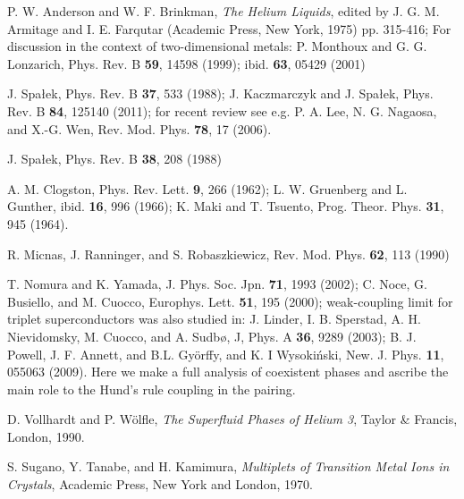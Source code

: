 \documentclass[aps,prb,showpacs,reprint]{revtex4-1}
\begin{document}
\begin{thebibliography}{99}
P. W. Anderson and W. F. Brinkman, \textit{The Helium Liquids}, edited by J. G.
M. Armitage and I. E. Farqutar (Academic Press, New York, 1975) pp. 315-416;
\newline
For discussion in the context of two-dimensional metals:\newline
P. Monthoux and G. G. Lonzarich, Phys. Rev. B {\bf 59}, 14598 (1999); ibid. {\bf 63}, 05429 (2001)


J. Spa\l ek, Phys. Rev. B {\bf 37}, 533 (1988); \newline
J. Kaczmarczyk and J. Spa\l ek, Phys. Rev. B {\bf 84}, 125140 (2011); \newline  
for recent review see e.g.
P. A. Lee, N. G. Nagaosa, and X.-G. Wen, Rev. Mod. Phys. {\bf 78}, 17 (2006).

J. Spa\l ek, Phys. Rev. B {\bf 38}, 208 (1988)

A. M. Clogston, Phys. Rev. Lett. {\bf 9}, 266 (1962);\newline
L. W. Gruenberg and L. Gunther, ibid. {\bf 16}, 996 (1966);\newline
K. Maki and T. Tsuento, Prog. Theor. Phys. {\bf 31}, 945 (1964).

R. Micnas, J. Ranninger, and S. Robaszkiewicz, Rev. Mod. Phys. {\bf 62}, 113
(1990)

T. Nomura and K. Yamada, J. Phys. Soc. Jpn. {\bf 71}, 1993 (2002);\newline
C. Noce, G. Busiello, and M. Cuocco, Europhys. Lett. {\bf 51}, 195
(2000);\newline
weak-coupling limit for triplet superconductors was also studied in:\newline
J. Linder, I. B. Sperstad, A. H. Nievidomsky, M. Cuocco, and A. Sudb\o, J,
Phys. A {\bf 36}, 9289 (2003);\newline
B. J. Powell, J. F. Annett, and B.L. Gy\"orffy, and K. I Wysoki\'{n}ski, New. J.
Phys. {\bf 11}, 055063 (2009). Here we make a full analysis of coexistent
phases and ascribe the main role to the Hund's rule coupling in the pairing.

D. Vollhardt and P. W\"{o}lfle, \textit{The Superfluid Phases of Helium 3},
Taylor \& Francis, London, 1990.

S. Sugano, Y. Tanabe, and H. Kamimura, \textit{Multiplets of Transition Metal Ions in Crystals}, Academic Press, New York and London, 1970.


\end{thebibliography}
\end{document}
